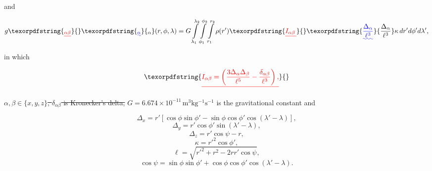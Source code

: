 \documentclass[extra, referee]{gji}
\providecommand{\DIFaddtex}[1]{{\protect\color{blue}\uwave{#1}}} %
\providecommand{\DIFdeltex}[1]{{\protect\color{red}\sout{#1}}}                      %
\providecommand{\DIFaddbegin}{} %
\providecommand{\DIFaddend}{} %
\providecommand{\DIFdelbegin}{} %
\providecommand{\DIFdelend}{} %
\providecommand{\DIFadd}[1]{\texorpdfstring{\DIFaddtex{#1}}{#1}} %
\providecommand{\DIFdel}[1]{\texorpdfstring{\DIFdeltex{#1}}{}} %
\newcommand{\DIFscaledelfig}{0.5}
\newlength{\DIFdelgraphicswidth} %
\newlength{\DIFdelgraphicsheight} %
\newcommand{\DIFaddincludegraphics}[2][]{{\color{blue}\fbox{\DIFOincludegraphics[#1]{#2}}}} %
\newcommand{\DIFdelincludegraphics}[2][]{%
\sbox{\DIFdelgraphicsbox}{\DIFOincludegraphics[#1]{#2}}%
\settoboxwidth{\DIFdelgraphicswidth}{\DIFdelgraphicsbox} %
\settoboxtotalheight{\DIFdelgraphicsheight}{\DIFdelgraphicsbox} %
\scalebox{\DIFscaledelfig}{%
\parbox[b]{\DIFdelgraphicswidth}{\usebox{\DIFdelgraphicsbox}\\[-\baselineskip] \rule{\DIFdelgraphicswidth}{0em}}\llap{\resizebox{\DIFdelgraphicswidth}{\DIFdelgraphicsheight}{%
\setlength{\unitlength}{\DIFdelgraphicswidth}%
\begin{picture}(1,1)%
\thicklines\linethickness{2pt} %
{\color[rgb]{1,0,0}\put(0,0){\framebox(1,1){}}}%
{\color[rgb]{1,0,0}\put(0,0){\line( 1,1){1}}}%
{\color[rgb]{1,0,0}\put(0,1){\line(1,-1){1}}}%
\end{picture}%
}\hspace*{3pt}}} %
} %
\DeclareRobustCommand{\DIFaddbegin}{\DIFOaddbegin \let\includegraphics\DIFaddincludegraphics} %
\DeclareRobustCommand{\DIFaddend}{\DIFOaddend \let\includegraphics\DIFOincludegraphics} %
\DeclareRobustCommand{\DIFdelbegin}{\DIFOdelbegin \let\includegraphics\DIFdelincludegraphics} %
\DeclareRobustCommand{\DIFdelend}{\DIFOaddend \let\includegraphics\DIFOincludegraphics} %
\begin{document}
\DIFdelend \noindent and

\begin{equation}
    g\DIFdelbegin \DIFdel{_{\alpha\beta}}\DIFdelend \DIFaddbegin \DIFadd{_{\alpha}}\DIFaddend (r,\phi,\lambda) = G
    \int\limits_{\lambda_1}^{\lambda_2}
    \int\limits_{\phi_1}^{\phi_2}
    \int\limits_{r_1}^{r_2}
    \rho(r') \DIFdelbegin \DIFdel{I_{\alpha\beta} \, }\DIFdelend \DIFaddbegin \DIFadd{\frac{\Delta_\alpha}{\ell^3}
    }\DIFaddend \kappa \, dr' d\phi' d\lambda',
\DIFdelbegin %
\DIFdelend \DIFaddbegin \label{eq:tesseroid-grav}
\DIFaddend \end{equation}

\noindent in which \DIFdelbegin %

\begin{displaymath}
    \DIFdel{I_{\alpha\beta} =
    \left(
        \frac{3\Delta_{\alpha} \Delta_{\beta}}{\ell^5} -
        \frac{\delta_{\alpha\beta}}{\ell^3}
    \right) ,
}\end{displaymath}%

\DIFdel{$\alpha, \beta \in \{x, y, z\}$,
$\delta_{\alpha\beta}$ is Kronecker's delta,
}\DIFdelend \DIFaddbegin \DIFadd{$\alpha \in \{x, y, z\}$,
}\DIFaddend $G = 6.674\times10^{-11}\, \text{m$^3$kg$^{-1}$s$^{-1}$}$ is the gravitational constant
and

\begin{equation}
    \Delta_x = r'[\cos\phi\sin\phi' - \sin\phi\cos\phi'
               \cos(\lambda' - \lambda)],
\end{equation}
\begin{equation}
    \Delta_y = r' \cos \phi' \sin(\lambda' - \lambda),
\end{equation}
\begin{equation}
    \Delta_z = r' \cos \psi - r,
\end{equation}
\begin{equation}
    \kappa = {r'}^2 \cos \phi',
\end{equation}
\begin{equation}
    \ell = \sqrt{{r'}^2 + r^2 - 2 r r' \cos \psi},
\label{eq:ell}
\end{equation}
\begin{equation}
    \cos\psi = \sin\phi\sin\phi' + \cos\phi\cos\phi'
                 \cos(\lambda' - \lambda).
\label{eq:cospsi}
\end{equation}
\end{document}
